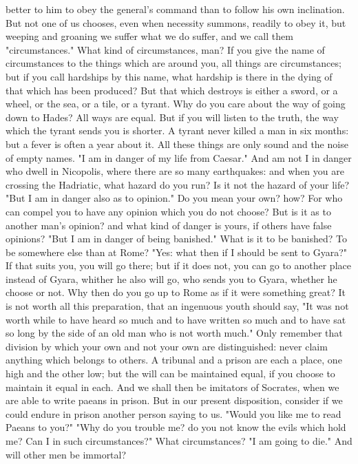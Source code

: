 \documentclass[a4paper]{article}
\begin{document}
better to him to obey the general's command than to follow his own inclination.
But not one of us chooses, even when necessity summons, readily to obey it, but
weeping and groaning we suffer what we do suffer, and we call them
"circumstances." What kind of circumstances, man? If you give the name of
circumstances to the things which are around you, all things are circumstances;
but if you call hardships by this name, what hardship is there in the dying of
that which has been produced? But that which destroys is either a sword, or a
wheel, or the sea, or a tile, or a tyrant. Why do you care about the way of
going down to Hades? All ways are equal. But if you will listen to the truth,
the way which the tyrant sends you is shorter. A tyrant never killed a man in
six months: but a fever is often a year about it. All these things are only
sound and the noise of empty names.
    "I am in danger of my life from Caesar." And am not I in danger who dwell
in Nicopolis, where there are so many earthquakes: and when you are crossing
the Hadriatic, what hazard do you run? Is it not the hazard of your life? "But
I am in danger also as to opinion." Do you mean your own? how? For who can
compel you to have any opinion which you do not choose? But is it as to another
man's opinion? and what kind of danger is yours, if others have false opinions?
"But I am in danger of being banished." What is it to be banished? To be
somewhere else than at Rome? "Yes: what then if I should be sent to Gyara?" If
that suits you, you will go there; but if it does not, you can go to another
place instead of Gyara, whither he also will go, who sends you to Gyara,
whether he choose or not. Why then do you go up to Rome as if it were something
great? It is not worth all this preparation, that an ingenuous youth should
say, "It was not worth while to have heard so much and to have written so much
and to have sat so long by the side of an old man who is not worth much." Only
remember that division by which your own and not your own are distinguished:
never claim anything which belongs to others. A tribunal and a prison are each
a place, one high and the other low; but the will can be maintained equal, if
you choose to maintain it equal in each. And we shall then be imitators of
Socrates, when we are able to write paeans in prison. But in our present
disposition, consider if we could endure in prison another person saying to us.
"Would you like me to read Paeans to you?" "Why do you trouble me? do you not
know the evils which hold me? Can I in such circumstances?" What circumstances?
"I am going to die." And will other men be immortal?
\end{document}
